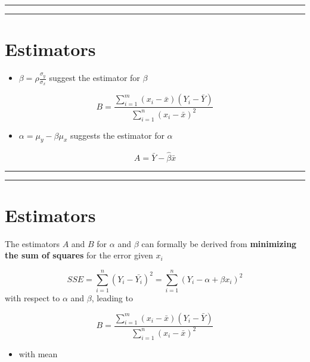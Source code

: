 \documentclass[
]{book}
\providecommand{\tightlist}{%
  \setlength{\itemsep}{0pt}\setlength{\parskip}{0pt}}
\begin{document}
\begin{center}\rule{0.5\linewidth}{0.5pt}\end{center}

\begin{center}\rule{0.5\linewidth}{0.5pt}\end{center}

\hypertarget{estimators-1}{%
\section{Estimators}\label{estimators-1}}

\begin{itemize}
\tightlist
\item
  \(\beta=\rho\frac{\sigma_y}{\sigma_x}\) suggest the estimator for \(\beta\)
\end{itemize}

\[B=\frac{\sum_{i=1}^m(x_i-\bar{x})(Y_i-\bar{Y})}{\sum_{i=1}^n(x_i-\bar{x})^2}\]

\begin{itemize}
\tightlist
\item
  \(\alpha=\mu_y-\beta\mu_x\) suggests the estimator for \(\alpha\)
\end{itemize}

\[A=\bar{Y}- \hat{\beta}\bar{x}\]

\begin{center}\rule{0.5\linewidth}{0.5pt}\end{center}

\begin{center}\rule{0.5\linewidth}{0.5pt}\end{center}

\hypertarget{estimators-2}{%
\section{Estimators}\label{estimators-2}}

The estimators \(A\) and \(B\) for \(\alpha\) and \(\beta\) can formally be derived from \textbf{minimizing the sum of squares} for the error given \(x_i\)

\[SSE=\sum_{i=1}^n(Y_i-\bar{Y_i})^2=\sum_{i=1}^n(Y_i-\alpha + \beta x_i)^2\]
with respect to \(\alpha\) and \(\beta\), leading to

\[B=\frac{\sum_{i=1}^m(x_i-\bar{x})(Y_i-\bar{Y})}{\sum_{i=1}^n(x_i-\bar{x})^2}\]

\begin{itemize}
\tightlist
\item
  with mean
\end{itemize}
\end{document}
